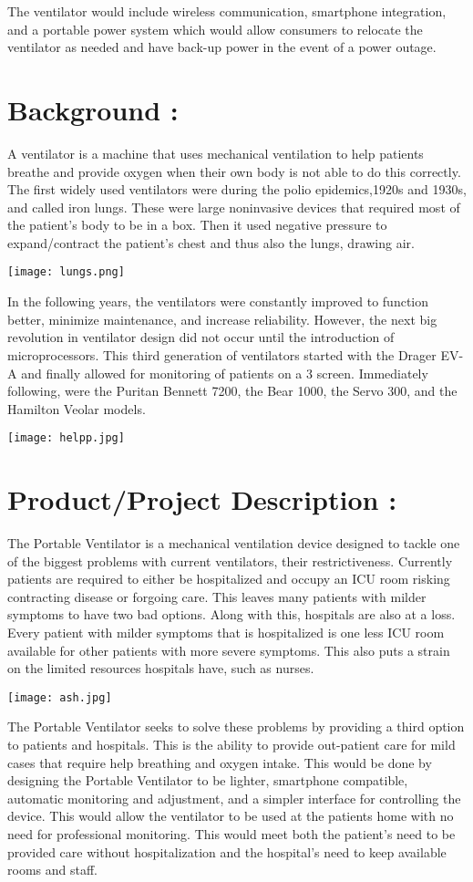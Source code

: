 \documentclass[12pt]{article}
\begin{document}
 The ventilator would
include wireless communication, smartphone integration, and a portable power system which
would allow consumers to relocate the ventilator as needed and have back-up power in the event
of a power outage.

\section*{Background : }
A ventilator is a machine that uses mechanical ventilation to help patients breathe and
provide oxygen when their own body is not able to do this correctly. The first widely used
ventilators were during the polio epidemics,1920s and 1930s, and called iron lungs. These were
large noninvasive devices that required most of the patient’s body to be in a box. Then it used
negative pressure to expand/contract the patient’s chest and thus also the lungs, drawing air.

\centering
\texttt{[image: lungs.png]}


In the following years, the ventilators were constantly improved to function better,
minimize maintenance, and increase reliability. However, the next big revolution in ventilator
design did not occur until the introduction of microprocessors. This third generation of
ventilators started with the Drager EV-A and finally allowed for monitoring of patients on a
3
screen. Immediately following, were the Puritan Bennett 7200, the Bear 1000, the Servo 300,
and the Hamilton Veolar models. 


\texttt{[image: helpp.jpg]}
\clearpage
\section*{Product/Project Description : }
The Portable Ventilator is a mechanical ventilation device designed to tackle one of the
biggest problems with current ventilators, their restrictiveness. Currently patients are required to
either be hospitalized and occupy an ICU room risking contracting disease or forgoing care. This
leaves many patients with milder symptoms to have two bad options. Along with this, hospitals
are also at a loss. Every patient with milder symptoms that is hospitalized is one less ICU room
available for other patients with more severe symptoms. This also puts a strain on the limited
resources hospitals have, such as nurses.


\texttt{[image: ash.jpg]}

The Portable Ventilator seeks to solve these problems by providing a third option to
patients and hospitals. This is the ability to provide out-patient care for mild cases that require
help breathing and oxygen intake. This would be done by designing the Portable Ventilator to be
lighter, smartphone compatible, automatic monitoring and adjustment, and a simpler interface for
controlling the device. This would allow the ventilator to be used at the patients home with no
need for professional monitoring. This would meet both the patient’s need to be provided care
without hospitalization and the hospital’s need to keep available rooms and staff.
\end{document}
